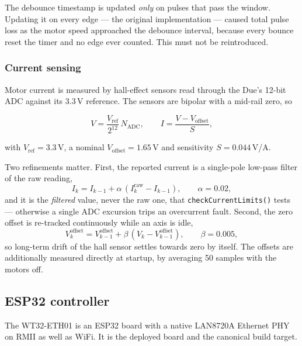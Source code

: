 \documentclass[11pt,a4paper]{article}
\begin{document}
The debounce timestamp is updated \emph{only} on pulses that pass the window. Updating it on every edge --- the original implementation --- caused total pulse loss as the motor speed approached the debounce interval, because every bounce reset the timer and no edge ever counted. This must not be reintroduced.

\subsubsection{Current sensing}

Motor current is measured by hall-effect sensors read through the Due's 12-bit ADC against its 3.3\,V reference. The sensors are bipolar with a mid-rail zero, so

\begin{equation}
V = \frac{V_\text{ref}}{2^{12}}\,N_\text{ADC},
\qquad
I = \frac{V - V_\text{offset}}{S},
\end{equation}

with $V_\text{ref} = 3.3$\,V, a nominal $V_\text{offset} = 1.65$\,V and sensitivity $S = 0.044$\,V/A.

Two refinements matter. First, the reported current is a single-pole low-pass filter of the raw reading,
\begin{equation}
I_k = I_{k-1} + \alpha\,(I^\text{raw}_k - I_{k-1}), \qquad \alpha = 0.02,
\end{equation}
and it is the \emph{filtered} value, never the raw one, that \texttt{checkCurrentLimits()} tests --- otherwise a single ADC excursion trips an overcurrent fault. Second, the zero offset is re-tracked continuously while an axis is idle,
\begin{equation}
V^\text{offset}_k = V^\text{offset}_{k-1} + \beta\,(V_k - V^\text{offset}_{k-1}), \qquad \beta = 0.005,
\end{equation}
so long-term drift of the hall sensor settles towards zero by itself. The offsets are additionally measured directly at startup, by averaging 50 samples with the motors off.

\subsection{ESP32 controller}

The WT32-ETH01 is an ESP32 board with a native LAN8720A Ethernet PHY on RMII as well as WiFi. It is the deployed board and the canonical build target.
\end{document}
